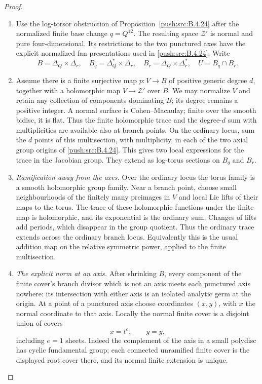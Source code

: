 \begin{proof}
\begin{enumerate}[label=\arabic*.,leftmargin=*]
\item Use the log-torsor obstruction of Proposition~\ref{push:src:B.4.24}
after the normalized finite base change $q=Q^{12}$.
The resulting space $\mathcal Z'$ is normal and
pure four-dimensional. Its restrictions to the two
punctured axes have the explicit normalized fan
presentations used in \ref{push:src:B.4.24}. Write
\[
 B=\Delta_Q\times\Delta_r,\quad
 B_q=\Delta_Q^*\times\Delta_r,\quad
 B_r=\Delta_Q\times\Delta_r^*,\quad
 U=B_q\cap B_r.
\]

\item Assume there is a finite surjective map
$p:V\to B$ of positive generic degree $d$, together
with a holomorphic map $V\to\mathcal Z'$ over $B$.
We may normalize $V$ and retain any collection of
components dominating $B$; its degree remains a
positive integer. A normal surface is Cohen--Macaulay;
finite over the smooth bidisc, it is flat. Thus the
finite holomorphic trace and the degree-$d$ sum with
multiplicities are available also at branch points.
On the ordinary locus, sum the
$d$ points of this multisection, with multiplicity,
in each of the two axial group origins of
\ref{push:src:B.4.24}. This gives two local expressions for the
trace in the Jacobian group. They extend as log-torus sections on $B_q$ and $B_r$.

\item \emph{Ramification away from the axes.}
Over the ordinary locus the torus family is a smooth
holomorphic group family. Near a branch point, choose
small neighbourhoods of the finitely many preimages
in $V$ and local Lie lifts of their maps to the torus.
The trace of these holomorphic functions under the
finite map is holomorphic, and its exponential is
the ordinary sum. Changes of lifts add periods,
which disappear in the group quotient. Thus the
ordinary trace extends across the ordinary branch
locus. Equivalently this is the usual addition map
on the relative symmetric power, applied to the
finite multisection.

\item \emph{The explicit norm at an axis.}
After shrinking $B$, every component of the finite
cover's branch divisor which is not an axis meets
each punctured axis nowhere: its intersection with
either axis is an isolated analytic germ at the
origin. At a point of a punctured axis choose
coordinates $(x,y)$, with $x$ the normal coordinate
to that axis. Locally the normal finite cover is
a disjoint union of covers
\begin{equation}
 x=t^e,\qquad y=y,
\label{pub:I:eq:B-4-26-1}
\end{equation}
including $e=1$ sheets. Indeed the complement of
the axis in a small polydisc has cyclic fundamental
group; each connected unramified finite cover is
the displayed root cover there, and its normal
finite extension is unique.


\end{enumerate}
\end{proof}
